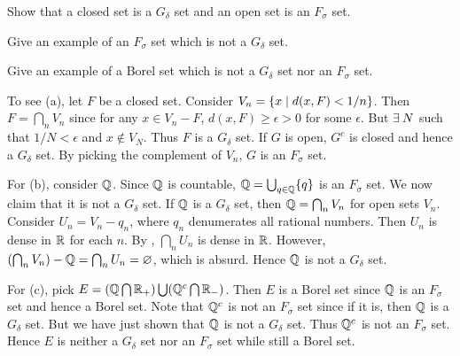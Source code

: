 \begin{exercise}
    \begin{thmenum}
        \item Show that a closed set is a $G_\delta$ set and 
        an open set is an $F_\sigma$ set.
        \item Give an example of an $F_\sigma$ set which is 
        not a $G_\delta$ set. 
        \item Give an example of a Borel set which is not a 
        $G_\delta$ set nor an $F_\sigma$ set.
    \end{thmenum}
\end{exercise}
\begin{pf}
    To see (a), let $F$ be a closed set. Consider $V_n 
    = \left\{ x \;\middle\vert\; d(x,F)<1/n \right\}$. Then $F = \bigcap_n V_n$ since 
    for any $x\in V_n-F$, $d(x,F)\geq \epsilon>0$ for some
    $\epsilon$. But $\exists\: N$ such that $1/N<\epsilon$ and 
    $x\not\in V_N$. Thus $F$ is a $G_\delta$ set. If $G$ is 
    open, $G^c$ is closed and hence a $G_\delta$ set. By 
    picking the complement of $V_n$, $G$ is an $F_\sigma$ 
    set.

    For (b), consider $\mathbb{Q}$. Since $\mathbb{Q}$ is countable, 
    $\mathbb{Q} = \bigcup_{q\in\mathbb{Q}}\{q\}$ is an $F_\sigma$ set. We now
    claim that it is not a $G_\delta$ set. If $\mathbb{Q}$ is a 
    $G_\delta$ set, then $\mathbb{Q} = \bigcap_n V_n$ for open sets 
    $V_n$. Consider $U_n = V_n-q_n$, where $q_n$ denumerates 
    all rational numbers. Then $U_n$ is dense in $\mathbb{R}$ for each 
    $n$. By , $\bigcap_n U_n$ is dense in $\mathbb{R}$. 
    However, $\pth{\bigcap_n V_n}-\Q = \bigcap_n U_n 
    = \varnothing$, which is absurd. Hence $\mathbb{Q}$ is not a 
    $G_\delta$ set.

    For (c), pick $E = (\mathbb{Q}\bigcap\mathbb{R}_+)\bigcup(\mathbb{Q}^c\bigcap\mathbb{R}_-)$.
    Then $E$ is a Borel set since $\mathbb{Q}$ is an $F_\sigma$ set and 
    hence a Borel set. Note that $\mathbb{Q}^c$ is not an $F_\sigma$ 
    set since if it is, then $\mathbb{Q}$ is a $G_\delta$ set. But we 
    have just shown that $\mathbb{Q}$ is not a $G_\delta$ set. Thus 
    $\mathbb{Q}^c$ is not an $F_\sigma$ set. Hence $E$ is neither a 
    $G_\delta$ set nor an $F_\sigma$ set while still a Borel 
    set.
\end{pf}

